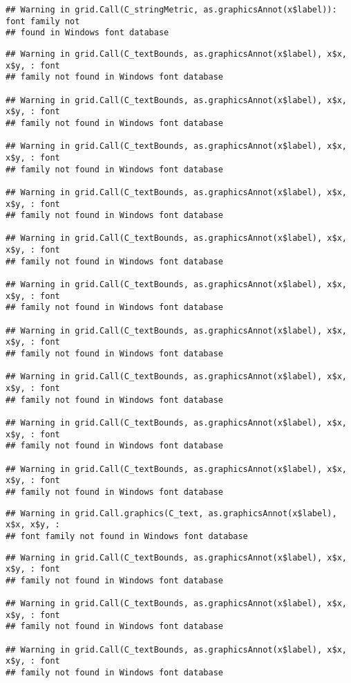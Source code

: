 \documentclass[
]{book}
\begin{document}
\begin{verbatim}
## Warning in grid.Call(C_stringMetric, as.graphicsAnnot(x$label)): font family not
## found in Windows font database
\end{verbatim}

\begin{verbatim}
## Warning in grid.Call(C_textBounds, as.graphicsAnnot(x$label), x$x, x$y, : font
## family not found in Windows font database

## Warning in grid.Call(C_textBounds, as.graphicsAnnot(x$label), x$x, x$y, : font
## family not found in Windows font database

## Warning in grid.Call(C_textBounds, as.graphicsAnnot(x$label), x$x, x$y, : font
## family not found in Windows font database

## Warning in grid.Call(C_textBounds, as.graphicsAnnot(x$label), x$x, x$y, : font
## family not found in Windows font database

## Warning in grid.Call(C_textBounds, as.graphicsAnnot(x$label), x$x, x$y, : font
## family not found in Windows font database

## Warning in grid.Call(C_textBounds, as.graphicsAnnot(x$label), x$x, x$y, : font
## family not found in Windows font database

## Warning in grid.Call(C_textBounds, as.graphicsAnnot(x$label), x$x, x$y, : font
## family not found in Windows font database

## Warning in grid.Call(C_textBounds, as.graphicsAnnot(x$label), x$x, x$y, : font
## family not found in Windows font database

## Warning in grid.Call(C_textBounds, as.graphicsAnnot(x$label), x$x, x$y, : font
## family not found in Windows font database

## Warning in grid.Call(C_textBounds, as.graphicsAnnot(x$label), x$x, x$y, : font
## family not found in Windows font database
\end{verbatim}

\begin{verbatim}
## Warning in grid.Call.graphics(C_text, as.graphicsAnnot(x$label), x$x, x$y, :
## font family not found in Windows font database
\end{verbatim}

\begin{verbatim}
## Warning in grid.Call(C_textBounds, as.graphicsAnnot(x$label), x$x, x$y, : font
## family not found in Windows font database

## Warning in grid.Call(C_textBounds, as.graphicsAnnot(x$label), x$x, x$y, : font
## family not found in Windows font database

## Warning in grid.Call(C_textBounds, as.graphicsAnnot(x$label), x$x, x$y, : font
## family not found in Windows font database
\end{verbatim}
\end{document}
